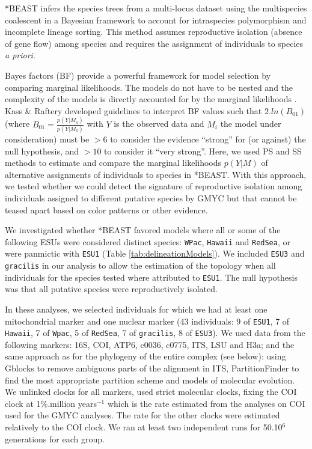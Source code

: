 \documentclass[12pt,letterpaper]{article}\usepackage[]{graphicx}\usepackage[]{color}
\begin{document}
*BEAST infers the species trees from a multi-locus dataset using the
multispecies coalescent in a Bayesian framework to account for intraspecies
polymorphism and incomplete lineage sorting. This method assumes reproductive
isolation (absence of gene flow) among species and requires the assignment of
individuals to species \textit{a priori}.

Bayes factors (BF) provide a powerful framework for model selection by comparing
marginal likelihoods. The models do not have to be nested and the complexity of
the models is directly accounted for by the marginal likelihoods
\citep{Baele2012}. Kass \& Raftery \citep{Kass1995} developed guidelines to
interpret BF values such that $2.ln(B_{01})$ (where $B_{01} =
\frac{p(Y|M_1)}{p(Y|M_0)}$ with $Y$ is the observed data and $M_i$ the model
under consideration) must be $> 6$ to consider the evidence ``strong'' for (or
against) the null hypothesis, and $> 10$ to consider it ``very strong''. Here,
we used PS and SS methods to estimate and compare the marginal likelihoods
$p(Y|M)$ of alternative assignments of individuals to species in *BEAST. With
this approach, we tested whether we could detect the signature of reproductive
isolation among individuals assigned to different putative species by GMYC but
that cannot be teased apart based on color patterns or other evidence.

We investigated whether *BEAST favored models where all or some of the following
ESUs were considered distinct species: \texttt{WPac}, \texttt{Hawaii} and
\texttt{RedSea}, or were panmictic with \texttt{ESU1} (Table
\ref{tab:delineationModels}). We included \texttt{ESU3} and \texttt{gracilis} in
our analysis to allow the estimation of the topology when all individuals for
the species tested where attributed to \texttt{ESU1}. The null hypothesis was
that all putative species were reproductively isolated.



In these analyses, we selected individuals for which we had at least one
mitochondrial marker and one nuclear marker (43
individuals: 9 of \texttt{ESU1},
7 of \texttt{Hawaii}, 7 of
\texttt{Wpac}, 5 of \texttt{RedSea},
7 of \texttt{gracilis}, 8 of
\texttt{ESU3}). We used data from the following markers: 16S, COI, ATP6, c0036,
c0775, ITS, LSU and H3a; and the same approach as for the phylogeny of the
entire complex (see below): using Gblocks to remove ambiguous parts of the
alignment in ITS, PartitionFinder to find the most appropriate partition scheme
and models of molecular evolution. We unlinked clocks for all markers, used
strict molecular clocks, fixing the COI clock at 1\%.million years$^{-1}$ which
is the rate estimated from the analyses on COI used for the GMYC analyses. The
rate for the other clocks were estimated relatively to the COI clock. We ran at
least two independent runs for 50.10$^{6}$ generations for each group.
\end{document}
